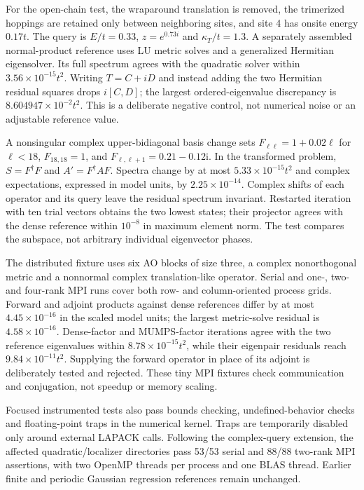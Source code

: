 \documentclass[11pt]{article}
\begin{document}
For the open-chain test, the wraparound translation is removed,
the trimerized hoppings are retained only between neighboring
sites, and site 4 has onsite energy $0.17t$.
The query is $E/t=0.33$, $z=e^{0.73i}$ and
$\kappa_T/t=1.3$. A separately assembled normal-product
reference uses LU metric solves and a generalized Hermitian
eigensolver. Its full spectrum agrees with the quadratic solver
within $3.56\times10^{-15}t^2$. Writing $T=C+iD$ and instead
adding the two Hermitian residual squares drops $i[C,D]$;
the largest ordered-eigenvalue discrepancy is
$8.604947\times10^{-2}t^2$. This is a deliberate negative control,
not numerical noise or an adjustable reference value.

A nonsingular complex upper-bidiagonal basis change sets
$F_{\ell\ell}=1+0.02\ell$ for $\ell<18$, $F_{18,18}=1$, and
$F_{\ell,\ell+1}=0.21-0.12\mathrm{i}$. In the transformed problem,
$S=F^\dagger F$ and $A'=F^\dagger A F$.
Spectra change by at most $5.33\times10^{-15}t^2$ and
complex expectations, expressed in model units, by
$2.25\times10^{-14}$. Complex shifts of each operator and its
query leave the residual spectrum invariant. Restarted iteration
with ten trial vectors obtains the two lowest states; their
projector agrees with the dense reference within $10^{-8}$
in maximum element norm. The test compares the subspace,
not arbitrary individual eigenvector phases.

The distributed fixture uses six AO blocks of size three,
a complex nonorthogonal metric and a nonnormal complex
translation-like operator. Serial and one-, two- and four-rank
MPI runs cover both row- and column-oriented process grids.
Forward and adjoint products against dense references differ
by at most $4.45\times10^{-16}$ in the scaled model units;
the largest metric-solve residual is $4.58\times10^{-16}$.
Dense-factor and MUMPS-factor iterations agree with the two
reference eigenvalues within $8.78\times10^{-15}t^2$, while
their eigenpair residuals reach $9.84\times10^{-11}t^2$.
Supplying the forward operator in place of its adjoint is
deliberately tested and rejected. These tiny MPI fixtures
check communication and conjugation, not speedup or memory scaling.

Focused instrumented tests also pass bounds checking,
undefined-behavior checks and floating-point traps in the
numerical kernel. Traps are temporarily disabled only around
external LAPACK calls. Following the complex-query extension,
the affected quadratic/localizer directories pass 53/53 serial
and 88/88 two-rank MPI assertions, with two OpenMP threads per
process and one BLAS thread. Earlier finite and periodic
Gaussian regression references remain unchanged.
\end{document}
